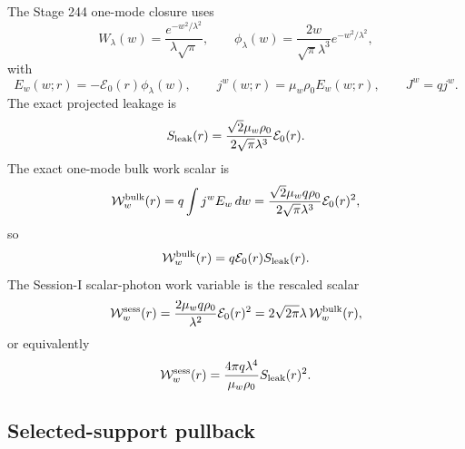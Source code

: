 The Stage 244 one-mode closure uses
\begin{equation}
\label{eq:app-part08-stage244-wlambda}
W_\lambda(w)=\frac{e^{-w^2/\lambda^2}}{\lambda\sqrt\pi},
\qquad
\phi_\lambda(w)=\frac{2w}{\sqrt\pi\lambda^3}e^{-w^2/\lambda^2},
\end{equation}
with
\begin{equation}
\label{eq:app-part08-stage244-ew-jw}
E_w(w;r)=-\mathcal E_0(r)\phi_\lambda(w),
\qquad
j^w(w;r)=\mu_w\rho_0E_w(w;r),
\qquad
J^w=qj^w.
\end{equation}
The exact projected leakage is
\begin{equation}
\label{eq:app-part08-stage244-sleak-e0}
S_{\rm leak}(r)
=
\frac{\sqrt2\mu_w\rho_0}{2\sqrt\pi\lambda^3}\mathcal E_0(r).
\end{equation}
The exact one-mode bulk work scalar is
\begin{equation}
\label{eq:app-part08-stage244-bulk-work}
\mathcal W_w^{\rm bulk}(r)
=
q\int j^wE_w\,dw
=
\frac{\sqrt2\mu_wq\rho_0}{2\sqrt\pi\lambda^3}\mathcal E_0(r)^2,
\end{equation}
so
\begin{equation}
\label{eq:app-part08-stage244-work-leak-relation}
\mathcal W_w^{\rm bulk}(r)=q\mathcal E_0(r)S_{\rm leak}(r).
\end{equation}
The Session-I scalar-photon work variable is the rescaled scalar
\begin{equation}
\label{eq:app-part08-stage244-session-work}
\mathcal W_w^{\rm sess}(r)
=
\frac{2\mu_wq\rho_0}{\lambda^2}\mathcal E_0(r)^2
=
2\sqrt{2\pi}\lambda\,\mathcal W_w^{\rm bulk}(r),
\end{equation}
or equivalently
\begin{equation}
\label{eq:app-part08-stage244-quadratic-law}
\mathcal W_w^{\rm sess}(r)
=
\frac{4\pi q\lambda^4}{\mu_w\rho_0}S_{\rm leak}(r)^2.
\end{equation}

\subsection{Selected-support pullback}
\label{subsec:app-part08-stage244-selected-pullback}

